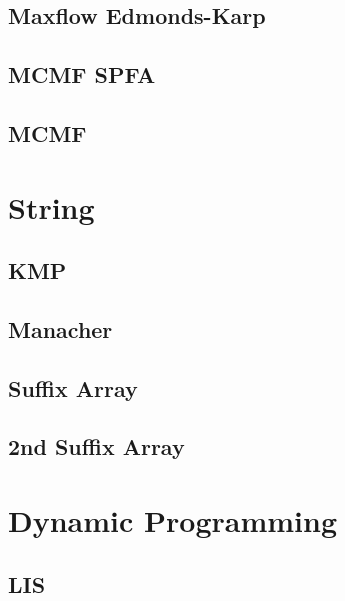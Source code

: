 \documentclass[10pt,landscape,a4paper,twocolumn]{article}
\begin{document}
\subsection{Maxflow Edmonds-Karp}


\subsection{MCMF SPFA}


\subsection{MCMF}



\section{String}
\subsection{KMP}


\subsection{Manacher}


\subsection{Suffix Array}


\subsection{2nd Suffix Array}






\section {Dynamic Programming}

\subsection{LIS}

\end{document}
